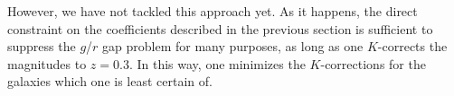 \documentclass[10pt,preprint]{aastex}
\begin{document}
However, we have not tackled this approach yet. As it happens, the
direct constraint on the coefficients described in the previous
section is sufficient to suppress the $g$/$r$ gap problem 
for many purposes, as long as one $K$-corrects the magnitudes to
$z=0.3$. In this way, one minimizes the $K$-corrections for the
galaxies which one is least certain of.




\end{document}
